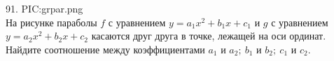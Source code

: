 91. {{PIC:grpar.png}}\\
На рисунке параболы $f$ с уравнением $y=a_1 x^2+b_1x+c_1$ и $g$ с уравнением $y=a_2 x^2+b_2x+c_2$ касаются друг друга в точке, лежащей на оси ординат. Найдите соотношение между коэффициентами $a_1$ и $a_2;\ b_1$ и $b_2;\ c_1$ и $c_2.$\\
